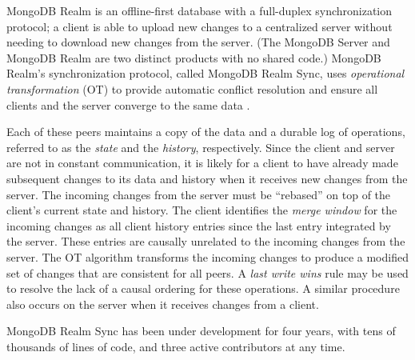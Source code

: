 \documentclass{vldb}
\begin{document}
MongoDB Realm is an offline-first database with a full-duplex synchronization protocol; a client is able to upload new changes to a centralized server without needing to download new changes from the server. 
(The MongoDB Server and MongoDB Realm are two distinct products with no shared code.)
MongoDB Realm's synchronization protocol, called MongoDB Realm Sync, uses \textit{operational transformation} (OT) to provide automatic conflict resolution and ensure all clients and the server converge to the same data \cite{Stigsen19RealmPatent}.

Each of these peers maintains a copy of the data and a durable log of operations, referred to as the \textit{state} and the \textit{history}, respectively. 
Since the client and server are not in constant communication, it is likely for a client to have already made subsequent changes to its data and history when it receives new changes from the server. The incoming changes from the server must be ``rebased'' on top of the client's current state and history. 
The client identifies the \textit{merge window} for the incoming changes as all client history entries since the last entry integrated by the server. 
These entries are causally unrelated to the incoming changes from the server. 
The OT algorithm transforms the incoming changes to produce a modified set of changes that are consistent for all peers. 
A \textit{last write wins} rule may be used to resolve the lack of a causal ordering for these operations. 
A similar procedure also occurs on the server when it receives changes from a client.


MongoDB Realm Sync has been under development for four years, with tens of thousands of lines of code, and three active contributors at any time.
\end{document}
